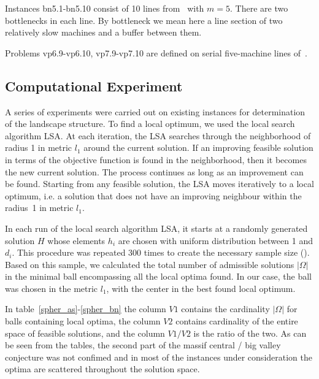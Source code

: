 \documentclass{ifacconf}
\begin{document}
Instances bn5.1-bn5.10 consist of 10 lines from~\cite{eng1} with $m=5$. There are two bottlenecks in each line. By
bottleneck we mean here a line section of two relatively slow machines and a buffer
between them. 

Problems vp6.9-vp6.10, vp7.9-vp7.10 are defined on serial five-machine lines of~\cite{vp}. 


\subsection{Computational Experiment} \label{subsec:experiment}

A series of experiments were carried out on existing instances for
determination of the landscape structure. 
To find a local optimum, we used the local search algorithm LSA. At each iteration, the LSA searches through the neighborhood of radius 1 in metric $l_1$ around
the current solution. If an improving feasible solution in terms of the  objective function is found in the neighborhood, then it becomes the new current solution.
The process continues as long as an improvement can be found.  Starting from any feasible solution, the LSA
moves iteratively to a local optimum, i.e. a solution that does not have an improving neighbour within the radius~1 in metric $l_1$.

In each run of the local search algorithm LSA, it starts at a randomly generated solution $H$ whose elements $h_i$ are chosen with
uniform distribution between 1 and $d_i$.
This procedure was repeated 300 times to create the necessary
sample size (\cite{Boese}). Based on this sample, we calculated the total
number of admissible solutions $|\Omega |$ in the minimal ball encompassing all the
local optima found. In our case, the ball was chosen in the metric $l_1$, with the center in the best found local optimum.

In table~\ref{spher_as}-\ref{spher_bn} the column $V1$ contains the cardinality $| \Omega |$ for balls containing
local optima, the column $V2$ contains cardinality of the entire space of feasible
solutions, and the column $V1/V2$ is the ratio of the two.
As can be seen from the tables, the second part of the massif central / big valley conjecture was not 
confimed and in most of the instances under consideration
the optima are scattered throughout the solution space.
\end{document}
